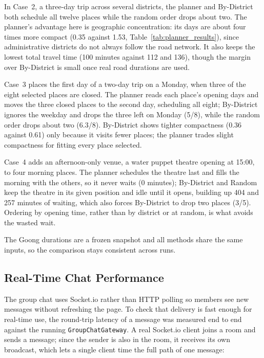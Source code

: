 \documentclass[a4paper,12pt]{report}
\begin{document}
In Case~2, a three-day trip across several districts, the planner and By-District both schedule all twelve places while the random order drops about two. The planner's advantage here is geographic concentration: its days are about four times more compact (0.35 against 1.53, Table~\ref{tab:planner_results}), since administrative districts do not always follow the road network. It also keeps the lowest total travel time (100 minutes against 112 and 136), though the margin over By-District is small once real road durations are used.

Case~3 places the first day of a two-day trip on a Monday, when three of the eight selected places are closed. The planner reads each place's opening days and moves the three closed places to the second day, scheduling all eight; By-District ignores the weekday and drops the three left on Monday (5/8), while the random order drops about two (6.3/8). By-District shows tighter compactness (0.36 against 0.61) only because it visits fewer places; the planner trades slight compactness for fitting every place selected.

Case~4 adds an afternoon-only venue, a water puppet theatre opening at 15:00, to four morning places. The planner schedules the theatre last and fills the morning with the others, so it never waits (0 minutes); By-District and Random keep the theatre in its given position and idle until it opens, building up 404 and 257 minutes of waiting, which also forces By-District to drop two places (3/5). Ordering by opening time, rather than by district or at random, is what avoids the wasted wait.

The Goong durations are a frozen snapshot and all methods share the same inputs, so the comparison stays consistent across runs.

\subsection{Real-Time Chat Performance}

The group chat uses Socket.io rather than HTTP polling so members see new messages without refreshing the page. To check that delivery is fast enough for real-time use, the round-trip latency of a message was measured end to end against the running \texttt{GroupChatGateway}. A real Socket.io client joins a room and sends a message; since the sender is also in the room, it receives its own broadcast, which lets a single client time the full path of one message:

\begin{center}
\end{center}
\end{document}
